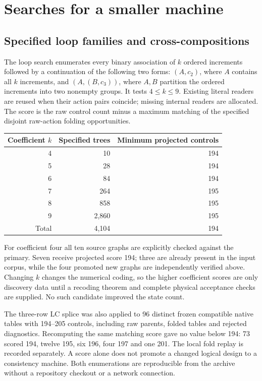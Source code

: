 \documentclass[11pt,a4paper]{article}
\begin{document}
\section{Searches for a smaller machine}
\label{sec:search}

\subsection{Specified loop families and cross-compositions}

The loop search enumerates every binary association of $k$ ordered
increments followed by a continuation of the following two forms:
$(A,c_2)$, where $A$ contains all $k$ increments, and
$(A,(B,c_3))$, where $A,B$ partition the ordered increments into two
nonempty groups. It tests $4\le k\le9$. Existing literal readers are
reused when their action pairs coincide; missing internal readers are
allocated. The score is the raw control count minus a maximum matching
of the specified disjoint raw-action folding opportunities.

\begin{center}
\begin{tabular}{@{}rrr@{}}
\toprule
Coefficient $k$ & Specified trees & Minimum projected controls\\
\midrule
4 & 10 & 194\\
5 & 28 & 194\\
6 & 84 & 194\\
7 & 264 & 195\\
8 & 858 & 195\\
9 & 2,860 & 195\\
\midrule
Total & 4,104 & 194\\
\bottomrule
\end{tabular}
\end{center}

For coefficient four all ten source graphs are explicitly checked against
the primary. Seven receive projected score 194; three are already present
in the input corpus, while the four promoted new graphs are independently
verified above. Changing $k$ changes the numerical coding, so the higher
coefficient scores are only discovery data until a recoding theorem and
complete physical acceptance checks are supplied. No such candidate
improved the state count.

The three-row LC splice was also applied to 96 distinct frozen compatible
native tables with 194--205 controls, including raw parents, folded
tables and rejected diagnostics. Recomputing the same matching score
gave no value below 194: 73 scored 194, twelve 195, six 196, four 197 and
one 201. The local fold replay is recorded separately. A score alone
does not promote a changed logical design to a consistency machine.
Both enumerations are reproducible from the archive without a repository
checkout or a network connection.
\end{document}
